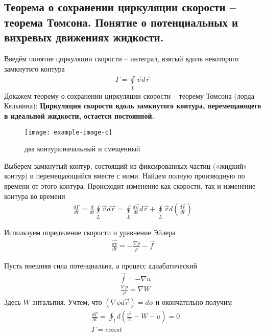\subsection{Теорема о сохранении циркуляции скорости – теорема Томсона. Понятие о потенциальных и вихревых движениях жидкости.}

Введём понятие циркуляции скорости – интеграл, взятый вдоль некоторого замкнутого контура
\begin{align*}
\Gamma = \oint \limits_ { L } \vec { v } d \vec { r }
\end{align*}
Докажем теорему о сохранении циркуляции скорости – теорему Томсона (лорда Кельвина):
\textbf{Циркуляция скорости вдоль замкнутого контура, перемещающего в идеальной жидкости, остается постоянной.}
\begin{figure}[h]
	\centering
	\texttt{[image: example-image-c]}
	\caption{два контура:начальный и смещенный}
	\label{fig:figure13}
\end{figure}
Выберем замкнутый контур, состоящий из фиксированных частиц («жидкий» контур) и перемещающийся вместе с ними.  Найдем полную производную по времени от этого контура. Происходит изменение как скорости, так и изменение контура во времени
\begin{align*}
\frac{d \Gamma}{d t}=\frac{d}{d t} \oint\limits_{L} \vec{v} d \vec{r}=\oint\limits_{L} \frac{d \vec{v}}{d t} d \vec{r}+\oint\limits_L \vec{v} d\left(\frac{d \vec{r}}{d t}\right)
\end{align*}

Используем определение скорости и уравнение Эйлера
\begin{align*}
\frac { \vec { d v } } { d t } = - \frac { \nabla p } { \rho } - \vec { f }
\end{align*}

Пусть внешняя сила потенциальна, а процесс адиабатический
\begin{align*}
&{ \vec { f } = - \nabla u } \\ 
&{ \frac { \nabla p } { \rho } = \nabla W }
\end{align*}
Здесь $W$ энтальпия.  Учтем, что $ ( \nabla \phi d \vec { r } ) = d \phi $ и окончательно получим
\begin{align*}
&\frac { d \Gamma } { d t } = \oint _ { l } d \left( \frac { v ^ { 2 } } { 2 } - W - u \right) = 0 \\
& \Gamma = const
\end{align*}

